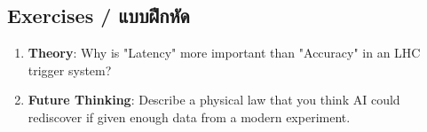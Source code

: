 \subsection{Exercises \quad / \quad \textthai{แบบฝึกหัด}}
\begin{enumerate}
    \item \textbf{Theory}: Why is "Latency" more important than "Accuracy" in an LHC trigger system?
    \item \textbf{Future Thinking}: Describe a physical law that you think AI could rediscover if given enough data from a modern experiment.
\end{enumerate}
